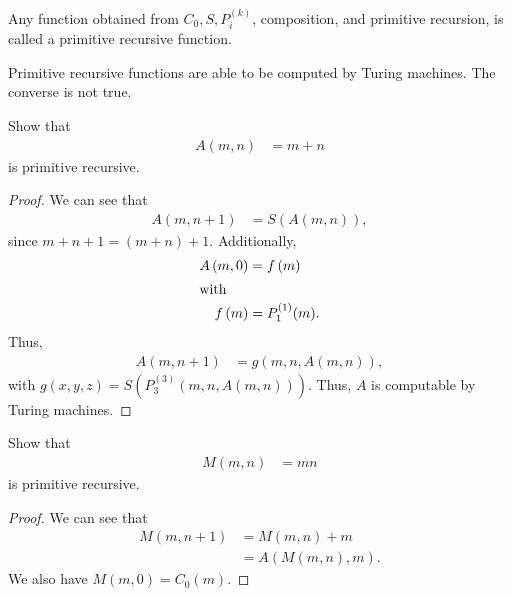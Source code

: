 \documentclass[10pt]{mypackage}
\begin{document}
\begin{definition}
  Any function obtained from $C_0,S,P_{i}^{(k)}$, composition, and primitive recursion, is called a primitive recursive function.
\end{definition}
\begin{theorem}
  Primitive recursive functions are able to be computed by Turing machines. The converse is not true.
\end{theorem}
\begin{example}
Show that
\begin{align*}
  A\left(m,n\right) &= m+n
\end{align*}
is primitive recursive.
\begin{proof}
  We can see that
  \begin{align*}
    A\left(m,n+1\right) &= S\left(A\left(m,n\right)\right),
  \end{align*}
  since $m+n + 1 = \left(m+n\right) + 1$. Additionally,
  \begin{align*}
    A\left(m,0\right) &= f\left(m\right)\\
    \intertext{with}
    f\left(m\right) &= P_{1}^{(1)}(m).
  \end{align*}
  Thus, 
  \begin{align*}
    A\left(m,n+1\right) &= g\left(m,n,A\left(m,n\right)\right),
  \end{align*}
  with $g\left(x,y,z\right) = S \left(P_{3}^{(3)}\left(m,n,A\left(m,n\right)\right)\right)$. Thus, $A$ is computable by Turing machines.
\end{proof}
\end{example}
\begin{example}
  Show that
  \begin{align*}
    M\left(m,n\right) &= mn
  \end{align*}
  is primitive recursive.
  \begin{proof}
    We can see that
    \begin{align*}
      M\left(m,n+1\right) &= M\left(m,n\right) + m\\
                        &= A\left(M\left(m,n\right),m\right).
    \end{align*}
    We also have $M\left(m,0\right) = C_{0}(m)$.
  \end{proof}
\end{example}
\end{document}
